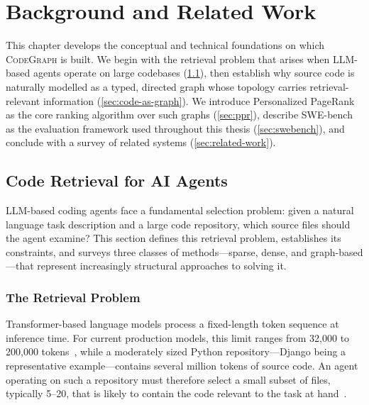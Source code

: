 \chapter{Background and Related Work}
\label{chap:background}

This chapter develops the conceptual and technical foundations on which \textsc{CodeGraph} is built.
We begin with the retrieval problem that arises when LLM-based agents operate on large codebases
(\cref{sec:code-retrieval}), then establish why source code is naturally modelled as a typed,
directed graph whose topology carries retrieval-relevant information (\cref{sec:code-as-graph}).
We introduce Personalized PageRank as the core ranking algorithm over such graphs
(\cref{sec:ppr}), describe SWE-bench as the evaluation framework used throughout this thesis
(\cref{sec:swebench}), and conclude with a survey of related systems (\cref{sec:related-work}).

\section{Code Retrieval for AI Agents}
\label{sec:code-retrieval}

LLM-based coding agents face a fundamental selection problem: given a natural language task description and a large code repository, which source files should the agent examine? This section defines this retrieval problem, establishes its constraints, and surveys three classes of methods---sparse, dense, and graph-based---that represent increasingly structural approaches to solving it.

\subsection{The Retrieval Problem}
\label{sec:retrieval-problem}

Transformer-based language models process a fixed-length token sequence at inference time. For current production models, this limit ranges from 32{,}000 to 200{,}000 tokens~\cite{gpt4,claude3}, while a moderately sized Python repository---Django being a representative example---contains several million tokens of source code. An agent operating on such a repository must therefore select a small subset of files, typically 5--20, that is likely to contain the code relevant to the task at hand~\cite{yang2024swebench}.

